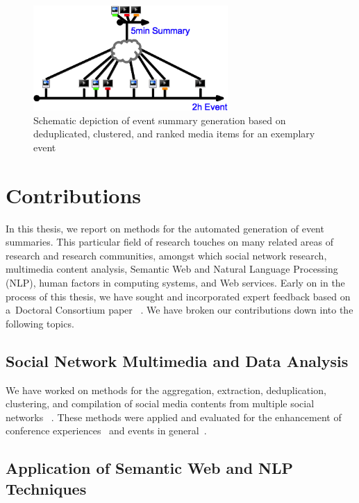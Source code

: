 \begin{figure}[!ht]
  \centering
  \includegraphics[height=4cm]{thesis-diagram.png}
  \caption[Schematic depiction of event summary generation]
    {Schematic depiction of event summary generation
    based on deduplicated, clustered, and ranked media items
    for an exemplary event}
  \label{fig:thesis-diagram}
\end{figure}

\section{Contributions}

In this thesis, we report on methods for
the automated generation of event summaries.
This particular field of research touches on many related areas
of research and research communities,
amongst which social network research, multimedia content analysis,
Semantic Web and Natural Language Processing (NLP),
human factors in computing systems,
and Web services.
Early on in the process of this thesis,
we have sought and incorporated expert feedback based on
a~Doctoral Consortium paper~%
\cite{steiner2011enrichingunstructured}.
We have broken our contributions down into
the following topics.

\subsection{Social Network Multimedia and Data Analysis}

We have worked on methods for the aggregation, extraction,
deduplication, clustering, and compilation
of social media contents from
multiple social networks~%
\cite{rizzo2012whatfresh}.
These methods were applied and evaluated
for the enhancement of conference experiences~%
\cite{khrouf2012aggregatingsocialmedia,khrouf2012confomaton}
and events in general~\cite{steiner2013crop,steiner2013meteoroid,steiner2013nearduplicate,steiner2013vhsrecording,steiner2014clustering,milicic2013live}.

\subsection{Application of Semantic Web and NLP Techniques}

